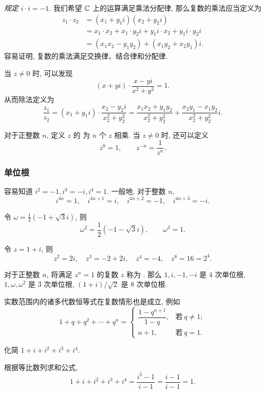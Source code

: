 \emph{规定 $i\cdot i=-1$}.
我们希望 ${\mathbb{C}}$ 上的运算满足乘法分配律, 那么复数的乘法应当定义为
  \begin{align*}
    z_1\cdot z_2&=(x_1+y_1i)(x_2+y_2i)\\
    &=x_1\cdot x_2+x_1\cdot y_2i+y_1i\cdot x_2+y_1i\cdot y_2i\\
    &=(x_1x_2-y_1y_2)+(x_1y_2+x_2y_1)i.
  \end{align*}
容易证明, 复数的乘法满足交换律、结合律和分配律.

当 $z\neq0$ 时, 可以发现
  \[(x+yi)\cdot\frac{x-yi}{x^2+y^2}=1.\]
从而除法定义为
  \[\frac{z_1}{z_2}=(x_1+y_1i)\cdot\frac{x_2-y_2i}{x_2^2+y_2^2}=\frac{x_1x_2+y_1y_2}{x_2^2+y_2^2}+\frac{x_2y_1-x_1y_2}{x_2^2+y_2^2}i.\]

对于正整数 $n$, 定义 $z$ 的 为 $n$ 个 $z$ 相乘.
当 $z\neq 0$ 时, 还可以定义
\[z^0=1,\qquad z^{-n}=\frac1{z^n}.\]

\subsubsection{单位根}
\begin{example}
  \begin{enumnopar}[(i)]
    \item 容易知道 $i^2=-1,i^3=-i,i^4=1$.
    一般地, 对于整数 $n$, 
    \[i^{4n}=1,\quad i^{4n+1}=i,\quad i^{4n+2}=-1,\quad i^{4n+3}=-i.\]
    \item 令 $\omega=\frac12(-1+\sqrt 3i)$, 则
    \[\omega^2=\frac12(-1-\sqrt3i),\qquad\omega^3=1.\]
    \item 令 $z=1+i$, {则
    \[z^2=2i,\quad z^3=-2+2i,\quad z^4=-4,\quad z^8=16=2^4.\]}
  \end{enumnopar}

  对于正整数 $n$, 将满足 $z^n=1$ 的复数 $z$ 称为 .
  那么 $1,i,-1,-i$ 是 $4$ 次单位根, $1,\omega,\omega^2$ 是 $3$ 次单位根, $(1+i)/\sqrt2$ 是 $8$ 次单位根.
\end{example}

实数范围内的诸多代数恒等式在复数情形也是成立, 例如
\[1+q+q^2+\cdots+q^n=\begin{cases}
  \dfrac{1-q^{n+1}}{1-q},&\text{若}\ q\neq 1;\\
  n+1,&\text{若}\ q=1.
\end{cases}\]

\begin{example}
  化简 $1+i+i^2+i^3+i^4$.
\end{example}
\begin{solution}
  根据等比数列求和公式,
  \[1+i+i^2+i^3+i^4=\frac{i^5-1}{i-1}
  {=\frac{i-1}{i-1}=1.}\]
\end{solution}

